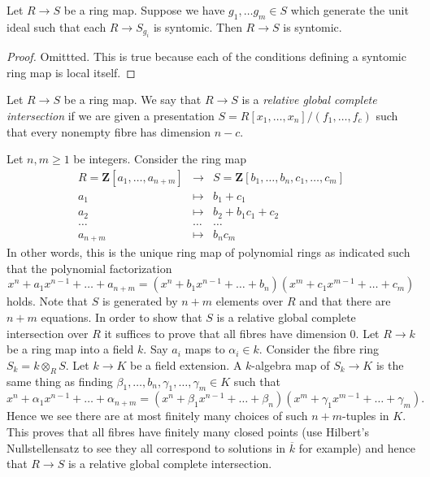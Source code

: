 \begin{lemma}
\label{lemma-local-syntomic}
Let $R \to S$ be a ring map.
Suppose we have $g_1, \ldots g_m \in S$ which generate the
unit ideal such that each $R \to S_{g_i}$ is syntomic.
Then $R \to S$ is syntomic.
\end{lemma}

\begin{proof}
Omittted. This is true because each of the conditions defining
a syntomic ring map is local itself.
\end{proof}

\begin{definition}
\label{definition-relative-global-complete-intersection}
Let $R \to S$ be a ring map. We say that $R \to S$ is
a {\it relative global complete intersection} if we are
given a presentation $S = R[x_1, \ldots, x_n]/(f_1, \ldots, f_c)$ such that
every nonempty fibre has dimension $n - c$.
\end{definition}

\begin{example}
\label{example-factor-polynomials}
Let $n , m \geq 1$ be integers. Consider the ring map
\begin{eqnarray*}
R = \mathbf{Z}[a_1, \ldots, a_{n + m}]
& \longrightarrow &
S = \mathbf{Z}[b_1, \ldots, b_n, c_1, \ldots, c_m] \\
a_1 & \longmapsto & b_1 + c_1 \\
a_2 & \longmapsto & b_2 + b_1 c_1 + c_2 \\
\ldots & \ldots & \ldots \\
a_{n + m} & \longmapsto & b_n c_m
\end{eqnarray*}
In other words, this is the unique ring map of polynomial rings
as indicated such that the polynomial factorization
$$
x^n + a_1 x^{n - 1} + \ldots + a_{n + m}
=
(x^n + b_1 x^{n - 1} + \ldots + b_n)
(x^m + c_1 x^{m - 1} + \ldots + c_m)
$$
holds. Note that $S$ is generated by $n + m$ elements over $R$
and that there are $n + m$ equations. In order to show that
$S$ is a relative global complete intersection over $R$ it suffices
to prove that all fibres have dimension $0$. Let $R \to k$ be a
ring map into a field $k$. Say $a_i$ maps to $\alpha_i \in k$.
Consider the fibre ring $S_k = k \otimes_R S$. Let $k \to K$ be
a field extension. A $k$-algebra map of $S_k \to K$ is the same thing as
finding $\beta_1, \ldots, b_n, \gamma_1, \ldots, \gamma_m \in K$
such that
$$
x^n + \alpha_1 x^{n - 1} + \ldots + \alpha_{n + m}
=
(x^n + \beta_1 x^{n - 1} + \ldots + \beta_n)
(x^m + \gamma_1 x^{m - 1} + \ldots + \gamma_m).
$$
Hence we see there are at most finitely many choices of
such $n + m$-tuples in $K$. This proves that all fibres
have finitely many closed points (use Hilbert's Nullstellensatz
to see they all correspond to solutions in $\overline{k}$ for example)
and hence that $R \to S$ is a relative global complete intersection.
\end{example}

